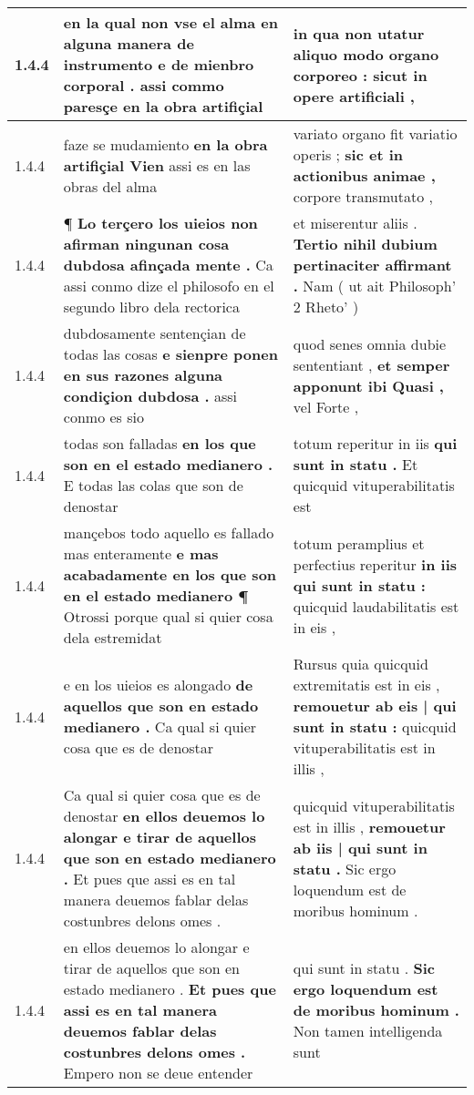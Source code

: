 \begin{tabular}{|p{1cm}|p{6.5cm}|p{6.5cm}|}
1.4.4 & en la qual non vse el alma \textbf{ en alguna manera de instrumento e de mienbro corporal . } assi commo paresçe en la obra artifiçial & in qua non utatur \textbf{ aliquo modo organo corporeo : } sicut in opere artificiali , \\\hline
1.4.4 & faze se mudamiento \textbf{ en la obra artifiçial Vien } assi es en las obras del alma & variato organo fit variatio operis ; \textbf{ sic et in actionibus animae , } corpore transmutato , \\\hline
1.4.4 & ¶ \textbf{ Lo terçero los uieios non afirman ningunan cosa dubdosa afinçada mente . } Ca assi conmo dize el philosofo en el segundo libro dela rectorica & et miserentur aliis . \textbf{ Tertio nihil dubium pertinaciter affirmant . } Nam ( ut ait Philosoph’ 2 Rheto’ ) \\\hline
1.4.4 & dubdosamente sentençian de todas las cosas \textbf{ e sienpre ponen en sus razones alguna condiçion dubdosa . } assi conmo es sio & quod senes omnia dubie sententiant , \textbf{ et semper apponunt ibi Quasi , } vel Forte , \\\hline
1.4.4 & todas son falladas \textbf{ en los que son en el estado medianero . } E todas las colas que son de denostar & totum reperitur in iis \textbf{ qui sunt in statu . } Et quicquid vituperabilitatis est \\\hline
1.4.4 & mançebos todo aquello es fallado mas enteramente \textbf{ e mas acabadamente en los que son en el estado medianero ¶ } Otrossi porque qual si quier cosa dela estremidat & totum peramplius et perfectius reperitur \textbf{ in iis qui sunt in statu : } quicquid laudabilitatis est in eis , \\\hline
1.4.4 & e en los uieios es alongado \textbf{ de aquellos que son en estado medianero . } Ca qual si quier cosa que es de denostar & Rursus quia quicquid extremitatis est in eis , \textbf{ remouetur ab eis | qui sunt in statu : } quicquid vituperabilitatis est in illis , \\\hline
1.4.4 & Ca qual si quier cosa que es de denostar \textbf{ en ellos deuemos lo alongar e tirar de aquellos que son en estado medianero . } Et pues que assi es en tal manera deuemos fablar delas costunbres delons omes . & quicquid vituperabilitatis est in illis , \textbf{ remouetur ab iis | qui sunt in statu . } Sic ergo loquendum est de moribus hominum . \\\hline
1.4.4 & en ellos deuemos lo alongar e tirar de aquellos que son en estado medianero . \textbf{ Et pues que assi es en tal manera deuemos fablar delas costunbres delons omes . } Empero non se deue entender & qui sunt in statu . \textbf{ Sic ergo loquendum est de moribus hominum . } Non tamen intelligenda sunt \\\hline

\end{tabular}
